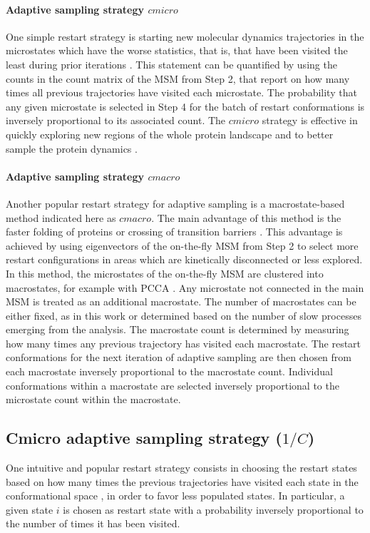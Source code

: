 \paragraph{Adaptive sampling strategy $cmicro$}
One simple restart strategy is starting new molecular dynamics trajectories in
the microstates which have the worse statistics, that is, that have been visited the least during prior iterations
\cite{weber2011characterization, Fabritiis-2014, AdaptivePELE-Lecina2017,
doerr2016htmd}. This statement can be quantified by using the counts in the count matrix of the MSM from Step 2,
that report on how many times all previous trajectories have visited each
microstate.  The probability that any given microstate is selected in Step 4 for
the batch of restart conformations is inversely proportional to its associated count. The $cmicro$ strategy is effective in quickly exploring new regions of the whole protein landscape and to better sample the protein dynamics \cite{Adstrategies2018}.


\paragraph{\label{sec:macro} Adaptive sampling strategy $cmacro$} 
Another popular restart strategy for adaptive sampling is a macrostate-based
method indicated here as $cmacro$. The main advantage of this
method is the faster folding of proteins or crossing of transition barriers
\cite{Adstrategies2018}. This advantage is achieved by using eigenvectors of
the on-the-fly MSM from Step 2 to select more restart configurations in areas which are
kinetically disconnected or less explored. In this method, the microstates of
the on-the-fly MSM are clustered into macrostates, for
example with PCCA \cite{roblitz2013fuzzy}. Any microstate not connected in the
main MSM is treated as an additional macrostate. The number of macrostates can
be either fixed, as in this work or determined based on the number of
slow processes emerging from the analysis. The macrostate count is determined by
measuring how many times any previous trajectory has visited each macrostate.
The restart conformations for the next iteration of adaptive sampling are then
chosen from each macrostate inversely proportional to the macrostate count.
Individual conformations within a macrostate are selected inversely
proportional to the microstate count within the macrostate.


\subsection{Cmicro adaptive sampling strategy ($1/C$)}
One intuitive and popular restart strategy consists in choosing the restart
states based on how many times the previous trajectories have visited each state
in the conformational space
\cite{weber2011characterization, Fabritiis-2014, AdaptivePELE-Lecina2017}, in
order to favor less populated states.  In particular, a
given state $i$ is chosen as restart state with a probability inversely
proportional to the number of times it has been visited.


